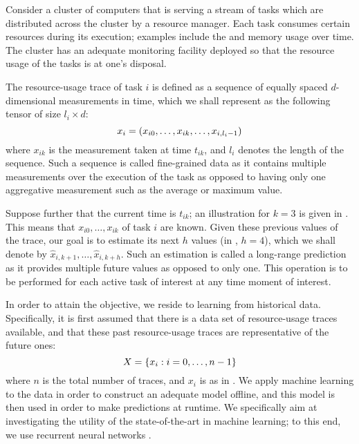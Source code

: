 Consider a cluster of computers that is serving a stream of tasks which are
distributed across the cluster by a resource manager. Each task consumes certain
resources during its execution; examples include the  and memory usage
over time. The cluster has an adequate monitoring facility deployed so that the
resource usage of the tasks is at one's disposal.

The resource-usage trace of task $i$ is defined as a sequence of equally spaced
$d$-dimensional measurements in time, which we shall represent as the following
tensor of size $l_i \times d$:
\begin{equation} \elab{trace}
  x_i = \left(x_{i0}, \dots, x_{ik}, \dots, x_{i,l_i - 1}\right)
\end{equation}
where $x_{ik}$ is the measurement taken at time $t_{ik}$, and $l_i$ denotes the
length of the sequence. Such a sequence is called fine-grained data as it
contains multiple measurements over the execution of the task as opposed to
having only one aggregative measurement such as the average or maximum value.

Suppose further that the current time is $t_{ik}$; an illustration for $k = 3$
is given in . This means that $x_{i0}, \dots, x_{ik}$ of task $i$
are known. Given these previous values of the trace, our goal is to estimate its
next $h$ values (in , $h = 4$), which we shall denote by
$\hat{x}_{i,k + 1}, \dots, \hat{x}_{i,k + h}$. Such an estimation is called a
long-range prediction as it provides multiple future values as opposed to only
one. This operation is to be performed for each active task of interest at any
time moment of interest.

In order to attain the objective, we reside to learning from historical data.
Specifically, it is first assumed that there is a data set of resource-usage
traces available, and that these past resource-usage traces are representative
of the future ones:
\begin{equation} \elab{traces}
  X = \{ x_i: i = 0, \dots, n - 1 \}
\end{equation}
where $n$ is the total number of traces, and $x_i$ is as in . We
apply machine learning to the data in order to construct an adequate model
offline, and this model is then used in order to make predictions at runtime. We
specifically aim at investigating the utility of the state-of-the-art in machine
learning; to this end, we use recurrent neural networks \cite{goodfellow2016}.

